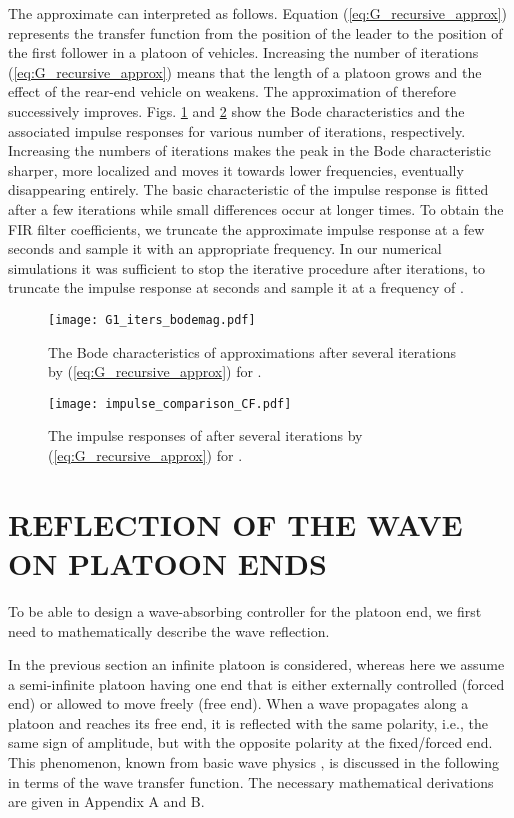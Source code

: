 \documentclass[final,5p,times,twocolumn]{elsarticle}
\begin{document}
The approximate  can interpreted as follows. Equation (\ref{eq:G_recursive_approx}) represents the transfer function from the position of the leader to the position of the first follower in a platoon of  vehicles. Increasing the number of iterations (\ref{eq:G_recursive_approx}) means that the length of a platoon grows and the effect of the rear-end vehicle on  weakens. The approximation of  therefore successively improves. Figs. \ref{fig:bode_comparison_only_exact} and \ref{fig:impulse_comparison_only_exact} show the Bode characteristics  and the associated impulse responses for various number of iterations, respectively. Increasing the numbers of iterations makes the peak in the Bode characteristic sharper, more localized and moves it towards lower frequencies, eventually disappearing entirely. The basic characteristic of the impulse response is fitted after a few iterations while small differences occur at longer times. To obtain the FIR filter coefficients, we truncate the approximate impulse response at a few seconds and sample it with an appropriate frequency. In our numerical simulations it was sufficient to stop the iterative procedure after  iterations, to truncate the impulse response at  seconds and sample it at a frequency of .

\begin{figure}[htb]\centering
  \texttt{[image: G1\_iters\_bodemag.pdf]}
  \caption{The Bode characteristics of  approximations after several iterations by (\ref{eq:G_recursive_approx}) for .}
  \label{fig:bode_comparison_only_exact}
\end{figure}
\begin{figure}[htb]\centering
\texttt{[image: impulse\_comparison\_CF.pdf]}
  \caption{The impulse responses of  after several iterations by (\ref{eq:G_recursive_approx}) for .}
  \label{fig:impulse_comparison_only_exact}
\end{figure}


\section{REFLECTION OF THE WAVE ON PLATOON ENDS}
\label{sec:reflections}

To be able to design a wave-absorbing controller for the platoon end, we first need to mathematically describe the wave reflection.

In the previous section an infinite platoon is considered, whereas here we assume a semi-infinite platoon having one end that is either externally controlled (forced end) or allowed to move freely (free end). When a wave propagates along a platoon and reaches its free end, it is reflected with the same polarity, i.e., the same sign of amplitude, but with the opposite polarity at the fixed/forced end. This phenomenon, known from basic wave physics \cite{french2003}, is discussed in the following in terms of the wave transfer function. The necessary mathematical derivations are given in Appendix A and B.
\end{document}
